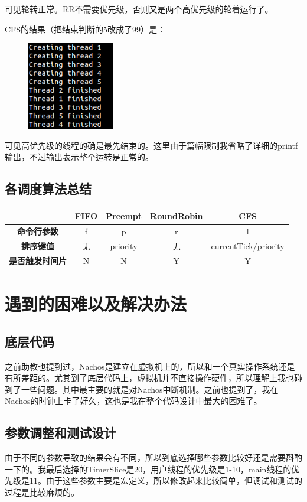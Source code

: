 \documentclass{ctexart}
\begin{document}
可见轮转正常。RR不需要优先级，否则又是两个高优先级的轮着运行了。

CFS的结果（把结束判断的5改成了99）是：
\begin{figure}[h!]
 \centering
\includegraphics[width=1.5in]{ex25.png}
\end{figure}

可见高优先级的线程的确是最先结束的。这里由于篇幅限制我省略了详细的printf输出，不过输出表示整个运转是正常的。

\subsection*{各调度算法总结}
\begin{table}[h]
\centering
\footnotesize
\begin{tabular}{|c|c|c|c|c|}\hline
& \textbf{FIFO} & \textbf{Preempt} & \textbf{RoundRobin} & \textbf{CFS} \\\hline
\textbf{命令行参数} & f & p & r & l \\\hline
\textbf{排序键值} & 无 & priority & 无 & currentTick/priority \\\hline
\textbf{是否触发时间片} & N & N & Y & Y \\\hline
\end{tabular}
\end{table}


\section{遇到的困难以及解决办法}
\subsection*{底层代码}
之前助教也提到过，Nachos是建立在虚拟机上的，所以和一个真实操作系统还是有所差距的。尤其到了底层代码上，虚拟机并不直接操作硬件，所以理解上我也碰到了一些问题。其中最主要的就是对Nachos中断机制。之前也提到了，我在Nachos的时钟上卡了好久，这也是我在整个代码设计中最大的困难了。
\subsection*{参数调整和测试设计}
由于不同的参数导致的结果会有不同，所以到底选择哪些参数比较好还是需要斟酌一下的。我最后选择的TimerSlice是20，用户线程的优先级是1-10，main线程的优先级是11。由于这些参数主要是宏定义，所以修改起来比较简单，但调试和测试的过程是比较麻烦的。
\end{document}
